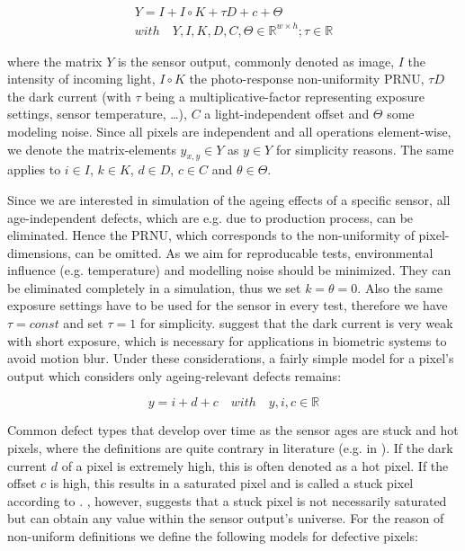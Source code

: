 \documentclass[10pt,twocolumn,letterpaper]{article}
\begin{document}
\begin{equation}
\begin{aligned}
 Y = I+I \circ K+\tau D +c+\Theta \\ with \quad Y,I,K,D,C, \Theta \in \mathbb{R}^{w \times h}; \tau \in \mathbb{R}
\end{aligned}
  \label{equ:pixelmodel}
 \end{equation}

where the matrix $Y$ is the sensor output, commonly denoted as image, $I$ the intensity of incoming light, $I \circ K$ the photo-response non-uniformity PRNU, $\tau D$ the dark current (with $\tau$ being a multiplicative-factor representing exposure settings, sensor temperature, \dots), $C$ a light-independent offset and $\Theta$ some modeling noise. Since all pixels are independent \cite{fridrich, defectDetection} and all operations element-wise, we denote the matrix-elements $y_{x,y} \in Y$ as $ y \in Y$ for simplicity reasons. The same applies to $i \in I$, $k \in K$, $d \in D$, $c \in C$ and $\theta \in \Theta$.

Since we are interested in simulation of the ageing effects of a specific sensor, all age-independent defects, which are e.g. due to production process, can be eliminated. Hence the PRNU, which corresponds to the non-uniformity of pixel-dimensions, can be omitted. As we aim for reproducable tests, environmental influence (e.g. temperature) and modelling noise should be minimized. They can be eliminated completely in a simulation, thus we set $k=\theta=0$. Also the same exposure settings have to be used for the sensor in every test, therefore we have $\tau = const$ and set $ \tau = 1$ for simplicity. \cite{camAndDisplays, radiometricCCD,failureSemi,fridrich} suggest that the dark current is very weak with short exposure, which is necessary for applications in biometric systems to avoid motion blur. Under these considerations, a fairly simple model for a pixel's output which considers only ageing-relevant defects remains:

\begin{equation}
  \label{equ:pixemodelEasier}
  y = i + d + c \quad with \quad y,i,c \in \mathbb{R}
\end{equation}

Common defect types that develop over time as the sensor ages are stuck and hot pixels, where the definitions are quite contrary in literature (e.g. in \cite{fridrich, defectIdentification, failureSemi}). If the dark current $d$ of a pixel is extremely high, this is often denoted as a hot pixel. If the offset $c$ is high, this results in a saturated pixel and is called a stuck pixel according to \cite{fridrich}. \cite{defectIdentification}, however, suggests that a stuck pixel is not necessarily saturated but can obtain any value within the sensor output's universe. For the reason of non-uniform definitions we define the following models for defective pixels:
\end{document}
